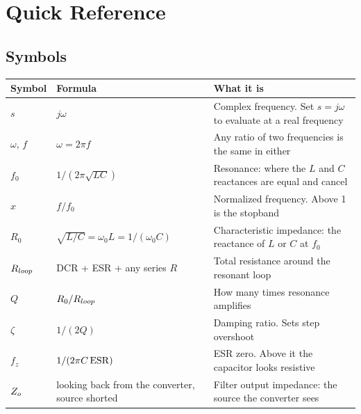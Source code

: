 \chapter{Quick Reference}
\label{ch:quickref}

\section{Symbols}

\begin{center}
	\small
	\begin{tabular}{@{}lp{}p{}@{}}
		\toprule
		Symbol                 & Formula                                      & What it is                                                                 \\
		\midrule
		$s$                    & $j\omega$                                    & Complex frequency. Set $s = j\omega$ to evaluate at a real frequency       \\
		$\omega$, $f$          & $\omega = 2\pi f$                            & Any ratio of two frequencies is the same in either                         \\
		$f_0$                  & $1/(2\pi\sqrt{LC})$                          & Resonance: where the $L$ and $C$ reactances are equal and cancel          \\
		$x$                    & $f/f_0$                                      & Normalized frequency. Above 1 is the stopband                              \\
		$R_0$                  & $\sqrt{L/C} = \omega_0 L = 1/(\omega_0 C)$   & Characteristic impedance: the reactance of $L$ or $C$ at $f_0$             \\
		$R_{loop}$               & DCR + ESR + any series $R$                   & Total resistance around the resonant loop                                  \\
		$Q$                    & $R_0/R_{loop}$                                 & How many times resonance amplifies                                         \\
		$\zeta$                & $1/(2Q)$                                     & Damping ratio. Sets step overshoot                                         \\
		$f_z$                  & $1/(2\pi C\,\mathrm{ESR})$                           & ESR zero. Above it the capacitor looks resistive                           \\
		$Z_o$                  & looking back from the converter, source shorted & Filter output impedance: the source the converter sees                  \\

\end{tabular}
\end{center}
